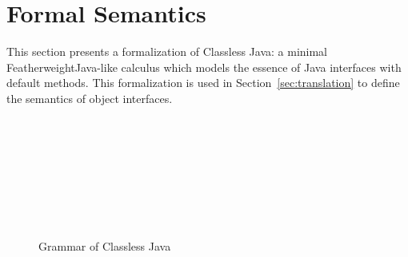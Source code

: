 


\section{Formal Semantics}\label{sec:formal}

This section presents a formalization of Classless Java: a minimal
FeatherweightJava-like calculus which models the essence of Java
interfaces with default methods. This formalization is used in
Section~\ref{sec:translation} to define the semantics of object interfaces.


\begin{figure}[t]
\begin{grammar}
\\
\\
\\
\\
\\
\\
\\
\end{grammar}
\caption{Grammar of Classless Java}
\label{Grammar}
\end{figure}

